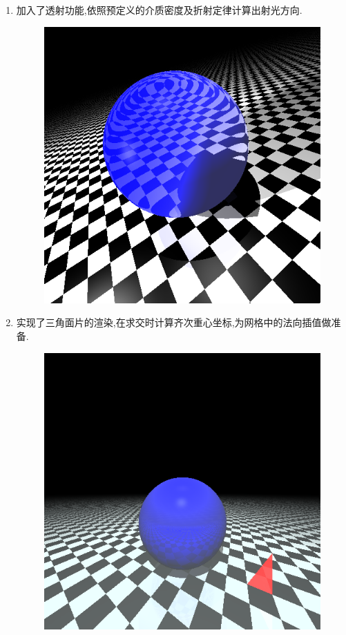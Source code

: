 \begin{enumerate}
  \item 加入了透射功能,依照预定义的介质密度及折射定律计算出射光方向.
    \begin{figure}[H]
      \centering
      \includegraphics[scale=0.4]{img/transmission.png}
      \caption*{\label{fig:transmission}}
    \end{figure}

  \item 实现了三角面片的渲染,在求交时计算齐次重心坐标,为网格中的法向插值做准备.
    \begin{figure}[H]
      \centering
      \includegraphics[scale=0.4]{img/face.png}
      \caption*{\label{fig:face}}
    \end{figure}


\end{enumerate}
